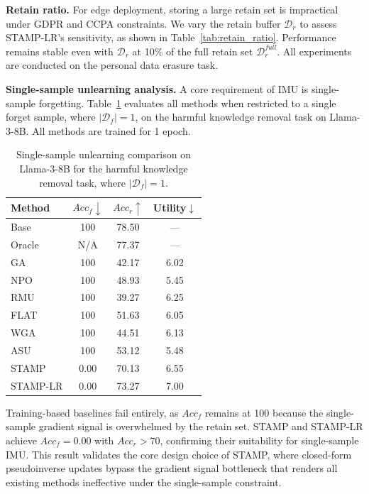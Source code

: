 \medskip
\noindent
\textbf{Retain ratio.}
For edge deployment, storing a large retain set is impractical under GDPR and CCPA constraints. We vary the retain buffer $\mathcal{D}_r$ to assess STAMP-LR's sensitivity, as shown in Table~\ref{tab:retain_ratio}. Performance remains stable even with $\mathcal{D}_r$ at 10\% of the full retain set $\mathcal{D}_r^{\textit{full}}$. All experiments are conducted on the personal data erasure task.


\medskip
\noindent
\textbf{Single-sample unlearning analysis.}
A core requirement of IMU is single-sample forgetting. Table~\ref{tab:single_sample} evaluates all methods when restricted to a single forget sample, where $|\mathcal{D}_f| = 1$, on the harmful knowledge removal task on Llama-3-8B. All methods are trained for 1 epoch.


\begin{table}[htbp]
\centering
\caption{Single-sample unlearning comparison on Llama-3-8B for the harmful knowledge removal task, where $|\mathcal{D}_f| = 1$.}
\label{tab:single_sample}
\small
\renewcommand{\arraystretch}{1.3}
\setlength{\tabcolsep}{8pt}
\begin{tabular}{lccc}
\toprule
\textbf{Method} & $Acc_f\!\downarrow$ & $Acc_r\!\uparrow$ & \textbf{Utility}$\downarrow$ \\
\midrule
Base   & 100  & 78.50 & --- \\
\rowcolor{gray!15}
Oracle & N/A  & 77.37 & --- \\
\midrule
GA~\citeauthor{yao2024large}        & 100  & 42.17 & 6.02 \\
\rowcolor{gray!15}
NPO~\citeauthor{zhang2024negative}  & 100  & 48.93 & 5.45 \\
RMU~\citeauthor{li2024wmdp}         & 100  & 39.27 & 6.25 \\
\rowcolor{gray!15}
FLAT~\citeauthor{wang2024llm}       & 100  & 51.63 & 6.05 \\
WGA~\citeauthor{wang2025rethinking} & 100  & 44.51 & 6.13 \\
\rowcolor{gray!15}
ASU~\citeauthor{zade2026attention}   & 100  & 53.12 & 5.48 \\
\midrule\midrule
STAMP    & 0.00 & 70.13 & 6.55 \\
STAMP-LR & 0.00 & 73.27 & 7.00 \\
\bottomrule
\end{tabular}
\end{table}

Training-based baselines fail entirely, as $Acc_f$ remains at 100 because the single-sample gradient signal is overwhelmed by the retain set. STAMP and STAMP-LR achieve $Acc_f = 0.00$ with $Acc_r > 70$, confirming their suitability for single-sample IMU. This result validates the core design choice of STAMP, where closed-form pseudoinverse updates bypass the gradient signal bottleneck that renders all existing methods ineffective under the single-sample constraint.